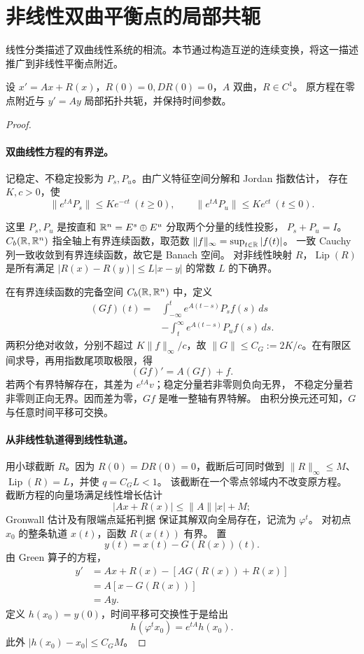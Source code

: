 \section{非线性双曲平衡点的局部共轭}
线性分类描述了双曲线性系统的相流。本节通过构造互逆的连续变换，将这一描述推广到非线性平衡点附近。
\begin{theorem}[局部双曲共轭]
设 $x'=Ax+R(x)$，$R(0)=0,DR(0)=0$，$A$ 双曲，$R\in C^1$。
原方程在零点附近与 $y'=Ay$ 局部拓扑共轭，并保持时间参数。
\end{theorem}
\begin{proof}
\paragraph{双曲线性方程的有界逆。}
记稳定、不稳定投影为 $P_s,P_u$。由广义特征空间分解和 Jordan 指数估计，
存在 $K,c>0$，使
\[
 \|e^{tA}P_s\|\leq Ke^{-ct}\ (t\geq0),\qquad
 \|e^{tA}P_u\|\leq Ke^{ct}\ (t\leq0).
\]

\noindent
这里 $P_s,P_u$ 是按直和 $\mathbb{R}^n=E^s\oplus E^u$ 分取两个分量的线性投影，
$P_s+P_u=I$。$C_b(\mathbb{R},\mathbb{R}^n)$ 指全轴上有界连续函数，取范数
$\|f\|_\infty=\sup_{t\in\mathbb{R}}|f(t)|$。
一致 Cauchy 列一致收敛到有界连续函数，故它是 Banach 空间。
对非线性映射 $R$，$\operatorname{Lip}(R)$ 是所有满足
$|R(x)-R(y)|\leq L|x-y|$ 的常数 $L$ 的下确界。
\medskip

在有界连续函数的完备空间 $C_b(\mathbb{R},\mathbb{R}^n)$ 中，定义
\[
 \begin{aligned}
 (Gf)(t)={}&\int_{-\infty}^te^{A(t-s)}P_sf(s)\,ds\\
 &-\int_t^\infty e^{A(t-s)}P_uf(s)\,ds.
\end{aligned}
\]
两积分绝对收敛，分别不超过 $K\|f\|_\infty/c$，故
$\|G\|\leq C_G:=2K/c$。在有限区间求导，再用指数尾项取极限，得
\[
 (Gf)'=A(Gf)+f.
\]
若两个有界特解存在，其差为 $e^{tA}v$；稳定分量若非零则负向无界，
不稳定分量若非零则正向无界。因而差为零，$Gf$ 是唯一整轴有界特解。
由积分换元还可知，$G$ 与任意时间平移可交换。

\paragraph{从非线性轨道得到线性轨道。}
用小球截断 $R$。因为 $R(0)=DR(0)=0$，截断后可同时做到
$\|R\|_\infty\leq M$、$\operatorname{Lip}(R)=L$，并使 $q=C_GL<1$。
该截断在一个零点邻域内不改变原方程。
截断方程的向量场满足线性增长估计
\[
 |Ax+R(x)|\leq\|A\||x|+M;
\]
Gronwall 估计及有限端点延拓判据
保证其解双向全局存在，记流为 $\varphi^t$。
对初点 $x_0$ 的整条轨道 $x(t)$，函数 $R(x(t))$ 有界。
置
\[
 y(t)=x(t)-G(R(x))(t).
\]
由 Green 算子的方程，
\[
 \begin{aligned}
 y'&=Ax+R(x)-[AG(R(x))+R(x)]\\
 &=A[x-G(R(x))]\\
 &=Ay.
\end{aligned}
\]
定义 $h(x_0)=y(0)$，时间平移可交换性于是给出
\[
 h(\varphi^tx_0)=e^{tA}h(x_0).
\]
此外 $|h(x_0)-x_0|\leq C_GM$。


\end{proof}
